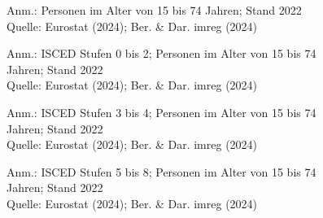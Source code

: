 \begin{figure}[p]
	{\centering {}}
	\label{map:arbeitslosenquotemaenner}
	\begin{spacing}{1} \scriptsize
		Anm.: Personen im Alter von 15 bis 74 Jahren; Stand 2022\\
		Quelle: Eurostat (2024); Ber. \& Dar. imreg (2024) \end{spacing}
\end{figure}


\begin{figure}[p]
	{\centering {}}
	\label{map:arbeitslosenquoteniedrig}
	\begin{spacing}{1} \scriptsize
		Anm.: ISCED Stufen 0 bis 2; Personen im Alter von 15 bis 74 Jahren; Stand 2022\\
		Quelle: Eurostat (2024); Ber. \& Dar. imreg (2024) \end{spacing}
\end{figure}


\begin{figure}[p]
	{\centering {}}
	\label{map:arbeitslosenquotemittel}
	\begin{spacing}{1} \scriptsize
		Anm.: ISCED Stufen 3 bis 4; Personen im Alter von 15 bis 74 Jahren; Stand 2022\\
		Quelle: Eurostat (2024); Ber. \& Dar. imreg (2024) \end{spacing}
\end{figure}


\begin{figure}[p]
	{\centering {}}
	\label{map:arbeitslosenquotehoch}
	\begin{spacing}{1} \scriptsize
		Anm.: ISCED Stufen 5 bis 8; Personen im Alter von 15 bis 74 Jahren; Stand 2022\\
		Quelle: Eurostat (2024); Ber. \& Dar. imreg (2024) \end{spacing}
\end{figure}


